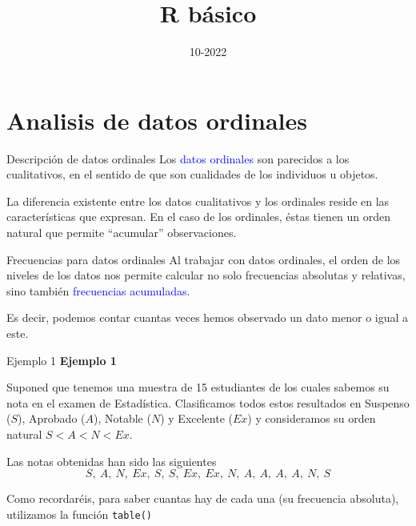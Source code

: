 \documentclass[
  ignorenonframetext,
  aspectratio=169]{beamer}
\title{R básico}
\author{}
\date{\vspace{-2.5em}10-2022}
\newcommand\blue[1]{\textcolor{blue}{#1}}
\begin{document}
\frame{\titlepage}

\begin{frame}[allowframebreaks]
  \tableofcontents[hideallsubsections]
\end{frame}
\hypertarget{analisis-de-datos-ordinales}{%
\section{Analisis de datos
ordinales}\label{analisis-de-datos-ordinales}}

\begin{frame}{Descripción de datos ordinales}
\protect\hypertarget{descripciuxf3n-de-datos-ordinales}{}
Los \blue{datos ordinales} son parecidos a los cualitativos, en el
sentido de que son cualidades de los individuos u objetos.

La diferencia existente entre los datos cualitativos y los ordinales
reside en las características que expresan. En el caso de los ordinales,
éstas tienen un orden natural que permite ``acumular'' observaciones.
\end{frame}

\begin{frame}{Frecuencias para datos ordinales}
\protect\hypertarget{frecuencias-para-datos-ordinales}{}
Al trabajar con datos ordinales, el orden de los niveles de los datos
nos permite calcular no solo frecuencias absolutas y relativas, sino
también \blue{frecuencias acumuladas}.

Es decir, podemos contar cuantas veces hemos observado un dato menor o
igual a este.
\end{frame}

\begin{frame}[fragile]{Ejemplo 1}
\protect\hypertarget{ejemplo-1}{}
\textbf{Ejemplo 1}

Suponed que tenemos una muestra de 15 estudiantes de los cuales sabemos
su nota en el examen de Estadística. Clasificamos todos estos resultados
en Suspenso (\(S\)), Aprobado (\(A\)), Notable (\(N\)) y Excelente
(\(Ex\)) y consideramos su orden natural \(S<A<N<Ex\).

Las notas obtenidas han sido las siguientes
\[S,\ A,\ N,\ Ex,\ S,\ S,\ Ex,\ Ex,\ N,\ A,\ A,\ A,\ A,\ N,\ S\]

Como recordaréis, para saber cuantas hay de cada una (su frecuencia
absoluta), utilizamos la función \texttt{table()}
\end{frame}
\end{document}
